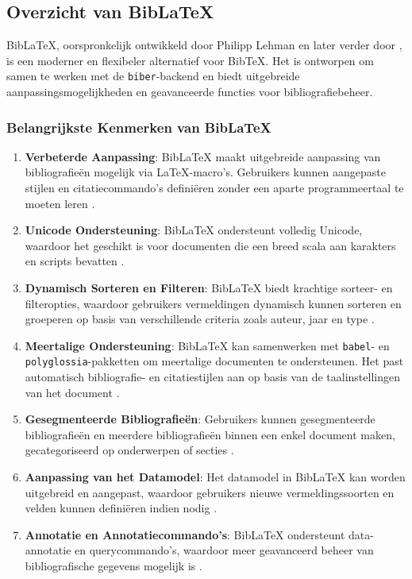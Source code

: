 \subsection{Overzicht van BibLaTeX}
BibLaTeX, oorspronkelijk ontwikkeld door Philipp Lehman en later verder door \textcite{Kime2024}, is een moderner en flexibeler alternatief voor BibTeX. Het is ontworpen om samen te werken met de \texttt{biber}-backend en biedt uitgebreide aanpassingsmogelijkheden en geavanceerde functies voor bibliografiebeheer.

\subsubsection{Belangrijkste Kenmerken van BibLaTeX}
\begin{enumerate}
    \item \textbf{Verbeterde Aanpassing}: BibLaTeX maakt uitgebreide aanpassing van bibliografieën mogelijk via \LaTeX{}-macro's. Gebruikers kunnen aangepaste stijlen en citatiecommando's definiëren zonder een aparte programmeertaal te moeten leren \autocite{Kime2024}.
    \item \textbf{Unicode Ondersteuning}: BibLaTeX ondersteunt volledig Unicode, waardoor het geschikt is voor documenten die een breed scala aan karakters en scripts bevatten \autocite{Kime2024}.
    \item \textbf{Dynamisch Sorteren en Filteren}: BibLaTeX biedt krachtige sorteer- en filteropties, waardoor gebruikers vermeldingen dynamisch kunnen sorteren en groeperen op basis van verschillende criteria zoals auteur, jaar en type \autocite{Kime2024}.
    \item \textbf{Meertalige Ondersteuning}: BibLaTeX kan samenwerken met \texttt{babel}- en \texttt{polyglossia}-pakketten om meertalige documenten te ondersteunen. Het past automatisch bibliografie- en citatiestijlen aan op basis van de taalinstellingen van het document \autocite{Kime2024}.
    \item \textbf{Gesegmenteerde Bibliografieën}: Gebruikers kunnen gesegmenteerde bibliografieën en meerdere bibliografieën binnen een enkel document maken, gecategoriseerd op onderwerpen of secties \autocite{Kime2024}.
    \item \textbf{Aanpassing van het Datamodel}: Het datamodel in BibLaTeX kan worden uitgebreid en aangepast, waardoor gebruikers nieuwe vermeldingssoorten en velden kunnen definiëren indien nodig \autocite{Kime2024}.
    \item \textbf{Annotatie en Annotatiecommando's}: BibLaTeX ondersteunt data-annotatie en querycommando's, waardoor meer geavanceerd beheer van bibliografische gegevens mogelijk is \autocite{Kime2024}.
\end{enumerate}

